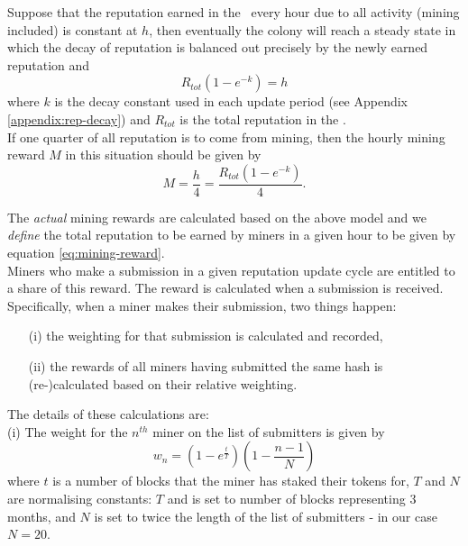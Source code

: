 Suppose that the reputation earned in the \rc\ every hour due to all activity (mining included) is constant at $h$, then eventually the colony will reach a steady state in which the decay of reputation is balanced out precisely by the newly earned reputation and
\begin{equation}
 R_{tot} \left( 1 - e^{-k} \right) = h
\end{equation}
\noindent where $k$ is the decay constant used in each update period (see Appendix \ref{appendix:rep-decay}) and $R_{tot}$ is the total reputation in the \rc.\\
If one quarter of all reputation is to come from mining, then the hourly mining reward $M$ in this situation should be given by
\begin{equation}\label{eq:mining-reward}
 M = \frac{h}{4} = \frac{R_{tot} \left( 1 - e^{-k} \right)}{4}.
\end{equation}

The \emph{actual} mining rewards are calculated based on the above model and we \emph{define} the total reputation to be earned by miners in a given hour to be given by equation \eqref{eq:mining-reward}.\\

Miners who make a submission in a given reputation update cycle are entitled to a share of this reward. The reward is calculated when a submission is received. Specifically, when a miner makes their submission, two things happen:
\begin{itemize}
 \item[(i)] the weighting for that submission is calculated and recorded,
 \item[(ii)] the rewards of all miners having submitted the same hash is (re-)calculated based on their relative weighting.
\end{itemize}
\noindent The details of these calculations are:\\

\noindent (i) The weight for the $n^{th}$ miner on the list of submitters is given by
\begin{equation}\label{eq:miner-weighting}
 w_n = \left(1 - e^{\frac{t}{T}}\right) \left( 1 - \frac{n-1}{N} \right)
\end{equation}
where $t$ is a number of blocks that the miner has staked their tokens for, $T$ and $N$ are normalising constants: $T$ and is set to number of blocks representing 3 months, and $N$ is set to twice the length of the list of submitters - in our case $N=20$.

